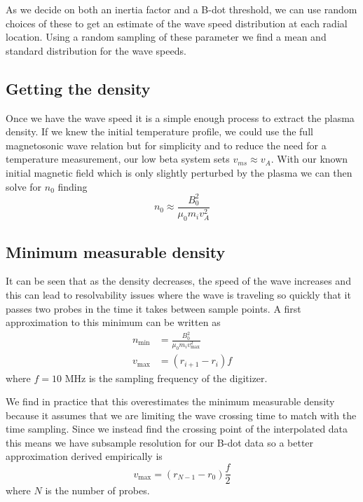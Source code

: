 As we decide on both an inertia factor and a B-dot threshold, we can use random choices of these to get an estimate of the wave speed distribution at each radial location. Using a random sampling of these parameter we find a mean and standard distribution for the wave speeds.

\subsection{Getting the density}

Once we have the wave speed it is a simple enough process to extract the plasma density. If we knew the initial temperature profile, we could use the full magnetosonic wave relation but for simplicity and to reduce the need for a temperature measurement, our low beta system sets $v_{ms} \approx v_A$. With our known initial magnetic field which is only slightly perturbed by the plasma we can then solve for $n_0$ finding
\begin{equation}
    n_0 \approx \frac{B_0^2}{\mu_0 m_i v_A^2}
\end{equation}

\subsection{Minimum measurable density}

It can be seen that as the density decreases, the speed of the wave increases and this can lead to resolvability issues where the wave is traveling so quickly that it passes two probes in the time it takes between sample points. A first approximation to this minimum can be written as
\begin{align}
    n_\text{min} &= \frac{B_0^2}{\mu_0 m_i v_{\text{max}}^2} \\
    v_\text{max} &= (r_{i + 1} - r_i) f
\end{align}
where $f = 10$ MHz is the sampling frequency of the digitizer.

We find in practice that this overestimates the minimum measurable density because it assumes that we are limiting the wave crossing time to match with the time sampling. Since we instead find the crossing point of the interpolated data this means we have subsample resolution for our B-dot data so a better approximation derived empirically is
\begin{equation}
    v_\text{max} = (r_{N - 1} - r_0) \frac{f}{2}
\end{equation}
where $N$ is the number of probes.


